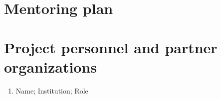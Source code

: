 \documentclass[10pt]{article}
\begin{document}
%
\clearpage
\setcounter{page}{1}

\section*{Mentoring plan}

%
\clearpage
\setcounter{page}{1}

\section*{Project personnel and partner organizations}

\begin{enumerate}
	\item Name; Institution; Role
\end{enumerate}


%
\clearpage
\setcounter{page}{1}

\setlength{\bibsep}{0pt}

%
\end{document}
